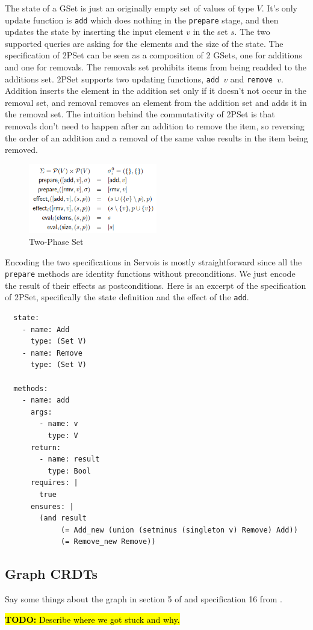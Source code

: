 \documentclass{article}
\newcommand{\TODO}[1]{\hl{\textbf{TODO:} #1}\xspace}
\begin{document}
The state of a GSet is just an originally empty set of values of type
$V$. It's only update function is \texttt{add} which does nothing in
the \texttt{prepare} stage, and then updates the state by inserting
the input element $v$ in the set $s$. The two supported queries are
asking for the elements and the size of the state. The specification
of 2PSet can be seen as a composition of 2 GSets, one for additions
and one for removals. The removals set prohibits items from being
readded to the additions set. 2PSet supports two updating functions,
\texttt{add $v$} and \texttt{remove $v$}. Addition inserts the element
in the addition set only if it doesn't not occur in the removal set,
and removal removes an element from the addition set and adds it in
the removal set. The intuition behind the commutativity of 2PSet is
that removals don't need to happen after an addition to remove the
item, so reversing the order of an addition and a removal of the same
value results in the item being removed.


\begin{figure}[h]
    \centering
    \includegraphics[width=0.5\textwidth]{2pset-definition}
    \caption{Two-Phase Set}
    \label{fig:2pset-def}
\end{figure}

Encoding the two specifications in Servois is mostly straightforward
since all the \texttt{prepare} methods are identity functions without
preconditions. We just encode the result of their effects as
postconditions. Here is an excerpt of the specification of 2PSet,
specifically the state definition and the effect of the \texttt{add}.

\begin{verbatim}
  state:
    - name: Add
      type: (Set V)
    - name: Remove
      type: (Set V)

  methods:
    - name: add
      args:
        - name: v
          type: V
      return:
        - name: result
          type: Bool
      requires: |
        true
      ensures: |
        (and result
             (= Add_new (union (setminus (singleton v) Remove) Add))
             (= Remove_new Remove))
\end{verbatim}

\subsection{Graph CRDTs}

Say some things about the graph in section 5 of
\cite{shapiro2011conflict} and specification 16 from
\cite{shapiro2011comprehensive}.

\TODO{Describe where we got stuck and why.}



\end{document}
